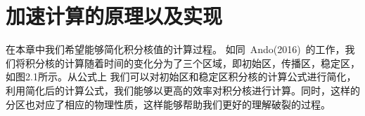 
\chapter{加速计算的原理以及实现}
    \indent 在本章中我们希望能够简化积分核值的计算过程。 如同~Ando(2016)~的工作，我们将积分核的计算随着时间的变化分为了三个区域，即初始区，传播区，稳定区，如图2.1所示。从公式上 我们可以对初始区和稳定区积分核的计算公式进行简化，利用简化后的计算公式，我们能够以更高的效率对积分核进行计算。同时，这样的分区也对应了相应的物理性质，这样能够帮助我们更好的理解破裂的过程。
         
